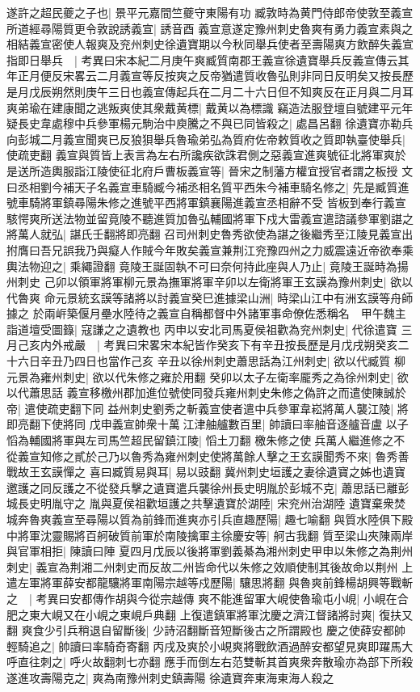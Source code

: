 遂許之超民夔之子也|{
	景平元嘉間竺夔守東陽有功}
臧敦時為黄門侍郎帝使敦至義宣所道經尋陽質更令敦說誘義宣|{
	誘音酉}
義宣意遂定豫州刺史魯爽有勇力義宣素與之相結義宣密使人報爽及兖州刺史徐遺寶期以今秋同舉兵使者至壽陽爽方飲醉失義宣指即日舉兵　|{
	考異曰宋本紀二月庚午爽臧質南郡王義宣徐遺寶舉兵反義宣傳云其年正月便反宋畧云二月義宣等反按爽之反帝猶遣質收魯弘則非同日反明矣又按長歷是月戊辰朔然則庚午三日也義宣傳起兵在二月二十六日但不知爽反在正月與二月耳}
爽弟瑜在建康聞之逃叛爽使其衆戴黄標|{
	戴黄以為標識}
竊造法服登壇自號建平元年疑長史韋處穆中兵參軍楊元駒治中庾騰之不與已同皆殺之|{
	處昌呂翻}
徐遺寶亦勒兵向彭城二月義宣聞爽已反狼狽舉兵魯瑜弟弘為質府佐帝敕質收之質即執臺使舉兵|{
	使疏吏翻}
義宣與質皆上表言為左右所讒疾欲誅君側之惡義宣進爽號征北將軍爽於是送所造輿服詣江陵使征北府戶曹板義宣等|{
	晉宋之制藩方權宜授官者謂之板授}
文曰丞相劉今補天子名義宣車騎臧今補丞相名質平西朱今補車騎名修之|{
	先是臧質進號車騎將軍鎮尋陽朱修之進號平西將軍鎮襄陽進義宣丞相辭不受}
皆板到奉行義宣駭愕爽所送法物並留竟陵不聽進質加魯弘輔國將軍下戍大雷義宣遣諮議參軍劉諶之將萬人就弘|{
	諶氏壬翻將即亮翻}
召司州刺史魯秀欲使為諶之後繼秀至江陵見義宣出拊膺曰吾兄誤我乃與癡人作賊今年敗矣義宣兼荆江兖豫四州之力威震遠近帝欲奉乘輿法物迎之|{
	乘繩證翻}
竟陵王誕固執不可曰奈何持此座與人乃止|{
	竟陵王誕時為揚州刺史}
己卯以領軍將軍柳元景為撫軍將軍辛卯以左衛將軍王玄謨為豫州刺史|{
	欲以代魯爽}
命元景統玄謨等諸將以討義宣癸巳進據梁山洲|{
	時梁山江中有洲玄謨等舟師據之}
於兩㟁築偃月壘水陸待之義宣自稱都督中外諸軍事命僚佐悉稱名　甲午魏主詣道壇受圖籙|{
	寇謙之之遺教也}
丙申以安北司馬夏侯祖歡為兖州刺史|{
	代徐遣寶}
三月己亥内外戒嚴　|{
	考異曰宋畧宋本紀皆作癸亥下有辛丑按長歷是月戊戌朔癸亥二十六日辛丑乃四日也當作己亥}
辛丑以徐州刺史蕭思話為江州刺史|{
	欲以代臧質}
柳元景為雍州刺史|{
	欲以代朱修之雍於用翻}
癸卯以太子左衛率龎秀之為徐州刺史|{
	欲以代蕭思話}
義宣移檄州郡加進位號使同發兵雍州刺史朱修之偽許之而遣使陳誠於帝|{
	遣使疏吏翻下同}
益州刺史劉秀之斬義宣使者遣中兵參軍韋崧將萬人襲江陵|{
	將即亮翻下使將同}
戊申義宣帥衆十萬江津舳艫數百里|{
	帥讀曰率舳音逐艫音盧}
以子慆為輔國將軍與左司馬竺超民留鎮江陵|{
	慆土刀翻}
檄朱修之使兵萬人繼進修之不從義宣知修之貳於己乃以魯秀為雍州刺史使將萬餘人擊之王玄謨聞秀不來|{
	魯秀善戰故王玄謨憚之}
喜曰臧質易與耳|{
	易以豉翻}
冀州刺史垣護之妻徐遺寶之姊也遺寶邀護之同反護之不從發兵擊之遺寶遣兵襲徐州長史明胤於彭城不克|{
	蕭思話已離彭城長史明胤守之}
胤與夏侯祖歡垣護之共擊遺寶於湖陸|{
	宋兖州治湖陸}
遺寶棄衆焚城奔魯爽義宣至尋陽以質為前鋒而進爽亦引兵直趣歷陽|{
	趣七喻翻}
與質水陸俱下殿中將軍沈靈賜將百舸破質前軍於南陵擒軍主徐慶安等|{
	舸古我翻}
質至梁山夾陳兩岸與官軍相拒|{
	陳讀曰陣}
夏四月戊辰以後將軍劉義綦為湘州刺史甲申以朱修之為荆州刺史|{
	義宣為荆湘二州刺史而反故二州皆命代以朱修之效順使制其後故命以荆州}
上遣左軍將軍薛安都龍驤將軍南陽宗越等戍歷陽|{
	驤思將翻}
與魯爽前鋒楊胡興等戰斬之　|{
	考異曰安都傳作胡與今從宗越傳}
爽不能進留軍大峴使魯瑜屯小峴|{
	小峴在合肥之東大峴又在小峴之東峴戶典翻}
上復遣鎮軍將軍沈慶之濟江督諸將討爽|{
	復扶又翻}
爽食少引兵稍退自留斷後|{
	少詩沼翻斷音短斷後古之所謂殿也}
慶之使薛安都帥輕騎追之|{
	帥讀曰率騎奇寄翻}
丙戌及爽於小峴爽將戰飲酒過醉安都望見爽即躍馬大呼直往刺之|{
	呼火故翻刺七亦翻}
應手而倒左右范雙斬其首爽衆奔散瑜亦為部下所殺遂進攻壽陽克之|{
	爽為南豫州刺史鎮壽陽}
徐遺寶奔東海東海人殺之

